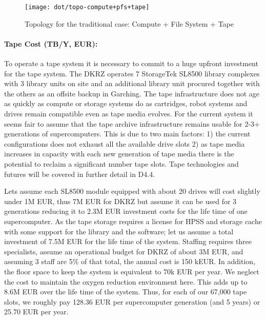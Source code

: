 \documentclass{../../template/esiwace-report}
\begin{document}
\begin{figure}[h]
	\centering
	\texttt{[image: dot/topo-compute+pfs+tape]}
	\caption{Topology for the traditional case: Compute + File System + Tape}
	\label{fig:topology compute + pfs + tape}
\end{figure}

%
%
%
%
%
%
%
%



\paragraph{Tape Cost (TB/Y, EUR):}
\label{calc:TAPE EUR/TB/Y}

To operate a tape system it is necessary to commit to a huge upfront investment for the tape system.
The DKRZ operates 7 StorageTek SL8500 library complexes with 3 library units on site and an additional library unit procured together with the others as an offsite backup in Garching.
The tape infrastructure does not age as quickly as compute or storage systems do as cartridges, robot systems and drives remain compatible even as tape media evolves.
For the current system it seems fair to assume that the tape archive infrastructure remains usable for 2-3+ generations of supercomputers.
This is due to two main factors: 1) the current configurations does not exhaust all the available drive slots 2) as tape media increases in capacity with each new generation of tape media there is the potential to reclaim a significant number tape slots.
Tape technologies and futures will be covered in further detail in D4.4.

Lets assume each SL8500 module equipped with about 20 drives will cost slightly under 1M EUR, thus 7M EUR for DKRZ but assume it can be used for 3 generations reducing it to 2.3M EUR investment costs for the life time of one supercomputer.
As the tape storage requires a license for HPSS and storage cache with some support for the library and the software; let us assume a total investment of 7.5M EUR for the life time of the system. 
Staffing requires three specialists, assume an operational budget for DKRZ of about 3M EUR, and assuming 3 staff are 5\% of that total, the annual cost is 150 kEUR.   
In addition, the floor space to keep the system is equivalent to 70k EUR per year.
We neglect the cost to maintain the oxygen reduction environment here.
This adds up to 8.6M EUR over the life time of the system.
Thus, for each of our 67,000 tape slots, we roughly pay 128.36 EUR per supercomputer generation (and 5 years) or 25.70 EUR per year.
\end{document}
